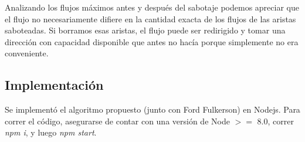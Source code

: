 \documentclass{article}
\begin{document}
Analizando los flujos máximos antes y después del sabotaje podemos apreciar que el flujo no necesariamente difiere en la cantidad exacta de los flujos de las aristas saboteadas. Si borramos esas aristas, el flujo puede ser redirigido y tomar una dirección con capacidad disponible que antes no hacía porque simplemente no era conveniente.

\subsection{Implementación}

Se implementó el algoritmo propuesto (junto con Ford Fulkerson) en Nodejs. Para correr el código, asegurarse de contar con una versión de Node $>=$ 8.0, correr \textit{npm i}, y luego \textit{npm start}.
\end{document}
